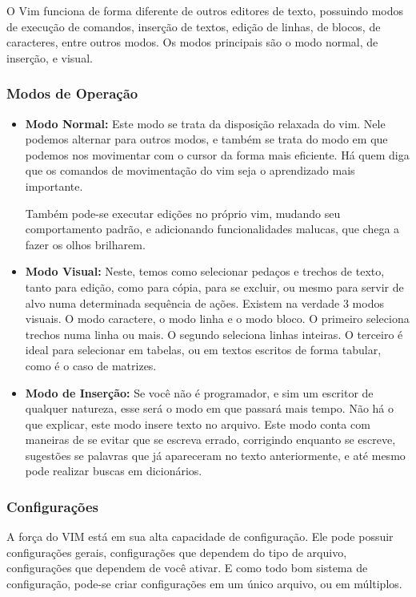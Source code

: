 \documentclass[a4paper, 12pt]{article}
\begin{document}
O Vim funciona de forma diferente de outros editores de texto, possuindo modos de execução de comandos, inserção de textos, edição de linhas, de blocos, de caracteres, entre outros modos.
Os modos principais são o modo normal, de inserção, e visual.

\subsubsection{Modos de Operação}
\begin{itemize}
    \item \textbf{Modo Normal:}
        Este modo se trata da disposição relaxada do vim.
        Nele podemos alternar para outros modos, e também se trata do modo em que podemos nos movimentar com o cursor da forma mais eficiente.
        Há quem diga que os comandos de movimentação do vim seja o aprendizado mais importante.
 

        Também pode-se executar edições no próprio vim, mudando seu comportamento padrão, e adicionando funcionalidades malucas, que chega a fazer os olhos brilharem.

    \item \textbf{Modo Visual:}
        Neste, temos como selecionar pedaços e trechos de texto, tanto para edição, como para cópia, para se excluir, ou mesmo para servir de alvo numa determinada sequência de ações.
        Existem na verdade 3 modos visuais.
        O modo caractere, o modo linha e o modo bloco.
        O primeiro seleciona trechos numa linha ou mais.
        O segundo seleciona linhas inteiras.
        O terceiro é ideal para selecionar em tabelas, ou em textos escritos de forma tabular, como é o caso de matrizes.


    \item \textbf{Modo de Inserção:}
        Se você não é programador, e sim um escritor de qualquer natureza, esse será o modo em que passará mais tempo.
        Não há o que explicar, este modo insere texto no arquivo.
        Este modo conta com maneiras de se evitar que se escreva errado, corrigindo enquanto se escreve, sugestões se palavras que já apareceram no texto anteriormente, e até mesmo pode realizar buscas em dicionários.

\end{itemize}

\subsubsection{Configurações}
A força do VIM está em sua alta capacidade de configuração.
Ele pode possuir configurações gerais, configurações que dependem do tipo de arquivo, configurações que dependem de você ativar.
E como todo bom sistema de configuração, pode-se criar configurações em um único arquivo, ou em múltiplos.
\end{document}
